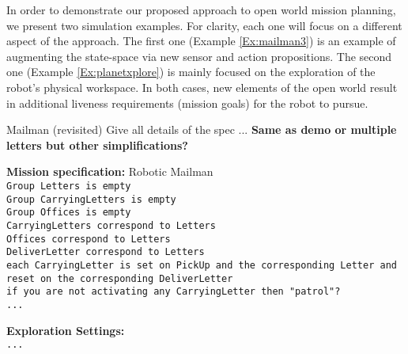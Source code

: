 In order to demonstrate our proposed approach to open world mission planning, we present two simulation examples. For clarity, each one will focus on a different aspect of the approach. The first one (Example \ref{Ex:mailman3}) is an example of augmenting the state-space via new sensor and action propositions. The second one (Example \ref{Ex:planetxplore}) is mainly focused on the exploration of the robot's physical workspace. In both cases, new elements of the open world result in additional liveness requirements (mission goals) for the robot to pursue.

\begin{myExample}\label{Ex:mailman3} Mailman (revisited)
	Give all details of the spec ... \textbf{Same as demo or multiple letters but other simplifications?}
\end{myExample}

\begin{algorithm}
	\textbf{Mission specification:} Robotic Mailman\\
	{\small
	\texttt{Group Letters is empty}\\
	\texttt{Group CarryingLetters is empty}\\
	\texttt{Group Offices is empty}\\
	
	\texttt{CarryingLetters correspond to Letters}\\
	\texttt{Offices correspond to Letters}\\
	\texttt{DeliverLetter correspond to Letters}\\
	
	\texttt{each CarryingLetter is set on PickUp and the corresponding Letter and reset on the corresponding DeliverLetter}\\
	
	\texttt{if you are not activating any CarryingLetter then "patrol"?}\\
	\texttt{...}\\
	}
	
	\textbf{Exploration Settings:}\\
	{\small
	\texttt{...} 
	}
\end{algorithm}


